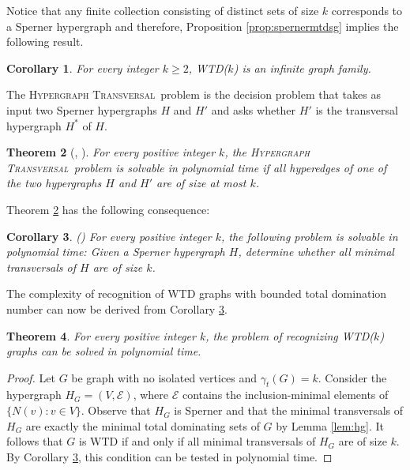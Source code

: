 \documentclass[11pt]{article}
\newcommand{\hp}{\textsc{Hypergraph Transversal~}}
\newtheorem{theorem}{Theorem}[section]
\newtheorem{corollary}[theorem]{Corollary}
\theoremstyle{definition}
\begin{document}
Notice that any finite collection consisting of distinct sets of size $k$
corresponds to a Sperner hypergraph and therefore, 
Proposition \ref{prop:spernermtdsg} implies the following result.

\begin{corollary}\label{cor:infwtdk}
For every integer $k\geq 2$, 
WTD($k$) is an infinite graph family.	
\end{corollary}

The \hp problem is the decision problem that takes as input two
Sperner hypergraphs $H$ and $H'$ and asks whether $H'$ is the transversal hypergraph $H^*$ of $H$. 

\begin{theorem}[\cite{eiter:1995}, \cite{boros:1998}]\label{thm:mintransk}
For every positive integer $k$,
the \hp problem is solvable in polynomial time if all hyperedges of one of the two
hypergraphs $H$ and $H'$ are of size at most $k$.
\end{theorem}

Theorem \ref{thm:mintransk} has the following consequence: 
\begin{corollary}\label{cor:wtdrec}
(\cite{gozupek:2017}) For every positive integer $k$,
the following problem is solvable in polynomial time: Given a Sperner hypergraph $H$, determine whether all minimal transversals of $H$ are of size $k$.
\end{corollary}

The complexity of recognition of WTD graphs with bounded total domination number can now be derived from Corollary \ref{cor:wtdrec}.

\begin{theorem}\label{thm:recWTDk}
For every positive integer $k$, the problem of recognizing  WTD($k$) graphs can be solved in polynomial time.
\end{theorem}
\begin{proof}
Let $G$ be graph with no isolated vertices and $\gamma_{t}(G)=k$. 
Consider the hypergraph $H_{G}=(V, \mathcal{E})$, where $\mathcal{E}$ contains the inclusion-minimal elements of $\{N(v): v \in V\}$. 
Observe that $H_{G}$ is Sperner and that the minimal transversals of $H_{G}$ are exactly the minimal total dominating sets of $G$ by Lemma \ref{lem:hg}. 
It follows that $G$ is WTD if and only if all minimal transversals of $H_{G}$ are of size $k$. 
By Corollary \ref{cor:wtdrec}, this condition can be tested in polynomial time.
\end{proof}
\end{document}
